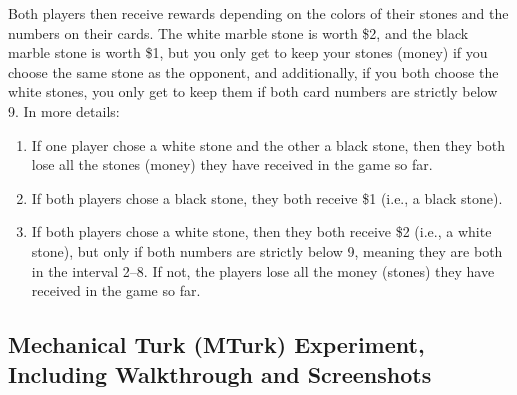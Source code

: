 Both players then receive rewards depending on the colors of their stones and the numbers on their cards. The white marble stone is worth \$2, and the black marble stone is worth \$1, but you only get to keep your stones (money) if you choose the same stone as the opponent, and additionally, if you both choose the white stones, you only get to keep them if both card numbers are strictly below 9. In more details:  
\begin{enumerate}
\item[a)] If one player chose a white stone and the other a black stone, then they both lose all the stones (money) they have received in the game so far.
\item[b)] If both players chose a black stone, they both receive \$1 (i.e., a black stone).
\item[c)] If both players chose a white stone, then they both receive \$2 (i.e., a white stone), but only if both numbers are strictly below 9, meaning they are both in the interval 2--8. If not, the players lose all the money (stones) they have received in the game so far.
\end{enumerate} 



\subsection{Mechanical Turk (MTurk) Experiment, Including Walkthrough and Screenshots}
\label{app:mturk-walkthrough} 




